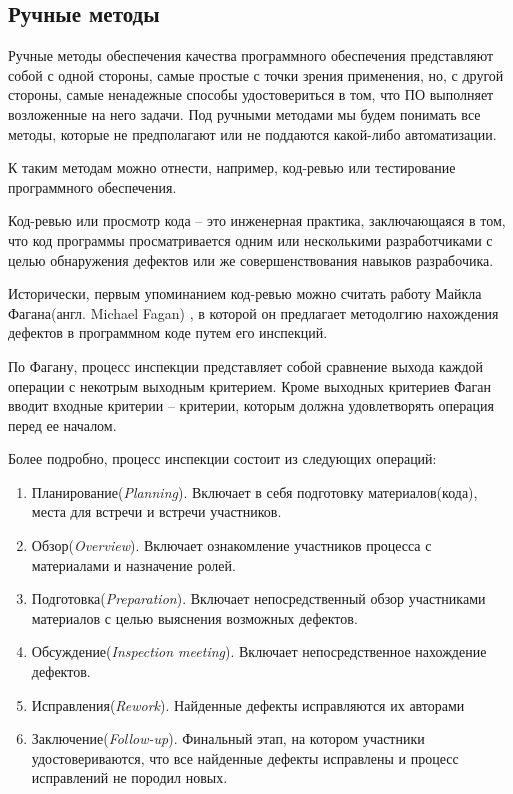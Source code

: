 \subsection{Ручные методы}

Ручные методы обеспечения качества программного обеспечения представляют собой с одной стороны, самые простые с точки зрения применения, но, с другой стороны, самые ненадежные способы удостовериться в том, что ПО выполняет возложенные на него задачи. Под ручными методами мы будем понимать все методы, которые не предполагают или не поддаются какой-либо автоматизации.

К таким методам можно отнести, например, код-ревью или тестирование программного обеспечения.

Код-ревью или просмотр кода -- это инженерная практика, заключающаяся в том, что код программы просматривается одним или несколькими разработчиками с целью обнаружения дефектов или же совершенствования навыков разрабочика.

Исторически, первым упоминанием код-ревью можно считать работу Майкла Фагана(англ. Michael Fagan) \cite{fagan1999design}, в которой он предлагает методолгию нахождения дефектов в программном коде путем его инспекций.

По Фагану, процесс инспекции представляет собой сравнение выхода каждой операции с некотрым выходным критерием. Кроме выходных критериев Фаган вводит входные критерии -- критерии, которым должна удовлетворять операция перед ее началом.

Более подробно, процесс инспекции состоит из следующих операций:

\begin{enumerate}
  \item Планирование(\textit{Planning}). Включает в себя подготовку материалов(кода), места для встречи и встречи участников.
  \item Обзор(\textit{Overview}). Включает ознакомление участников процесса с материалами и назначение ролей.
  \item Подготовка(\textit{Preparation}). Включает непосредственный обзор участниками материалов с целью выяснения возможных дефектов.
  \item Обсуждение(\textit{Inspection meeting}). Включает непосредственное нахождение дефектов.
  \item Исправления(\textit{Rework}). Найденные дефекты исправляются их авторами
  \item Заключение(\textit{Follow-up}). Финальный этап, на котором участники удостовериваются, что все найденные дефекты исправлены и процесс исправлений не породил новых.
\end{enumerate}

